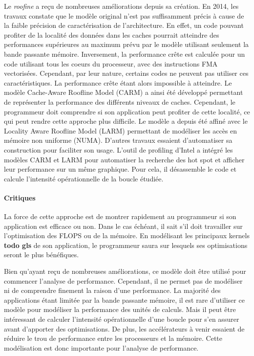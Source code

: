         
            Le \textit{roofine} a reçu de nombreuses améliorations depuis sa création. En 2014, les travaux \cite{Ilic2014} constate que le modèle original n’est pas suffisamment précis à cause de la faible précision de caractérisation de l’architecture. En effet, un code pouvant profiter de la localité des données dans les caches pourrait atteindre des performances supérieures au maximum prévu par le modèle utilisant seulement la bande passante mémoire. Inversement, la performance crête est calculée pour un code utilisant tous les coeurs du processeur, avec des instructions \gls{FMA} vectorisées. Cependant, par leur nature, certains codes ne peuvent pas utiliser ces  caractéristiques. La performance crête étant alors impossible à atteindre. Le modèle Cache-Aware Roofline Model (CARM) \cite{Ilic2014} a ainsi été développé permettant de représenter la performance des différents niveaux de caches. Cependant, le programmeur doit comprendre si son application peut profiter de cette localité, ce qui peut rendre cette approche plus difficile. Le modèle a depuis été affiné avec le Locality Aware Roofline Model (LARM) \cite{Denoyelle2018} permettant de modéliser les accès en mémoire non uniforme (NUMA).
            D’autres travaux essaient d’automatiser sa construction \cite{lo2014roofline} pour faciliter son usage. L’outil de profiling d’Intel a intégré les modèles CARM et LARM pour automatiser la recherche des hot spot et afficher leur performance sur un même graphique. Pour cela, il désassemble le code et calcule l’intensité opérationnelle de la boucle étudiée.

        \paragraph{Critiques}

            
            La force de cette approche est de montrer rapidement au programmeur si son application est efficace ou non. Dans le cas échéant, il sait s’il doit travailler sur l’optimisation des FLOPS ou de la mémoire. En modélisant les principaux kernels \textbf{todo gls} de son application, le programmeur saura sur lesquels ses optimisations seront le plus bénéfiques.
            
            Bien qu'ayant reçu de nombreuses améliorations, ce modèle doit être utilisé pour commencer l’analyse de performance. Cependant, il ne permet pas de modéliser ni de comprendre finement la raison d’une performance.
            La majorité des applications étant limitée par la bande passante mémoire, il est rare d’utiliser ce modèle pour modéliser la performance des unités de calculs. Mais il peut être intéressant de calculer l’intensité opérationnelle d’une boucle pour s’en assurer avant d’apporter des optimisations. De plus, les accélérateurs à venir essaient de réduire le trou de performance entre les processeurs et la mémoire. Cette modélisation est donc importante pour l’analyse de performance.


